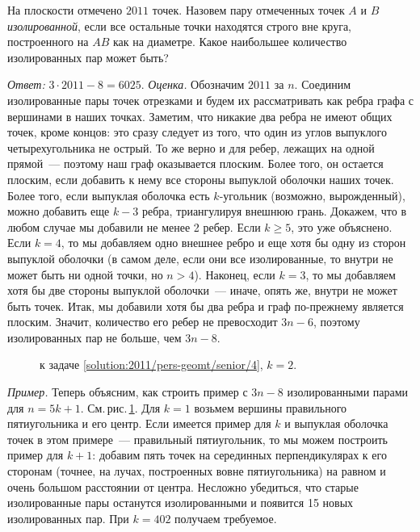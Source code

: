 На плоскости отмечено $2011$ точек.
Назовем пару отмеченных точек $A$ и $B$ \emph{изолированной}, если все остальные
точки находятся строго вне круга, построенного на $AB$ как на диаметре.
Какое наибольшее количество изолированных пар может быть?

\solution
\label{solution:2011/pers-geomt/senior/4}%
\emph{Ответ:}
$3 \cdot 2011 - 8 = 6025$.
\emph{Оценка.}
Обозначим $2011$ за $n$.
Соединим изолированные пары точек отрезками и будем их рассматривать как ребра
графа с вершинами в наших точках.
Заметим, что никакие два ребра не имеют общих точек, кроме концов:
это сразу следует из того, что один из углов выпуклого четырехугольника не
острый.
То же верно и для ребер, лежащих на одной прямой~--- поэтому наш граф
оказывается плоским.
Более того, он остается плоским, если добавить к нему все стороны выпуклой
оболочки наших точек.
Более того, если выпуклая оболочка есть $k$-угольник (возможно, вырожденный),
можно добавить еще $k - 3$ ребра, триангулируя внешнюю грань.
Докажем, что в любом случае мы добавили не менее 2 ребер.
Если $k \geq 5$, это уже объяснено.
Если $k = 4$, то мы добавляем одно внешнее ребро и еще хотя бы одну из сторон
выпуклой оболочки
(в самом деле, если они все изолированные, то внутри не может быть ни одной
точки, но $n > 4$).
Наконец, если $k = 3$, то мы добавляем хотя бы две стороны выпуклой
оболочки~--- иначе, опять же, внутри не может быть точек.
Итак, мы добавили хотя бы два ребра и граф по-прежнему является плоским.
Значит, количество его ребер не превосходит $3 n - 6$, поэтому изолированных
пар не больше, чем $3 n - 8$.
\\
\begin{figure}
\centering
\caption{к задаче \ref{solution:2011/pers-geomt/senior/4}, $k = 2$.}
\label{fig:solution:2011/pers-geomt/senior/4}
\end{figure}%
\emph{Пример.}
Теперь объясним, как строить пример с $3 n - 8$ изолированными парами для
$n = 5 k + 1$.
См.\,рис.\,\ref{fig:solution:2011/pers-geomt/senior/4}.
Для $k = 1$ возьмем вершины правильного пятиугольника и его центр.
Если имеется пример для $k$ и выпуклая оболочка точек в этом примере~---
правильный пятиугольник, то мы можем построить пример для $k + 1$:
добавим пять точек на серединных перпендикулярах к его сторонам (точнее, на
лучах, построенных вовне пятиугольника) на равном и очень большом расстоянии от
центра.
Несложно убедиться, что старые изолированные пары останутся изолированными и
появится 15 новых изолированных пар.
При $k = 402$ получаем требуемое.


